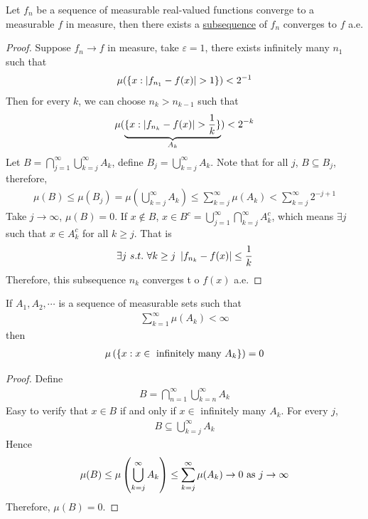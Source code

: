 \documentclass[11pt]{article}
\begin{document}
	\begin{proposition}
		Let $f_n$ be a sequence of measurable real-valued functions converge to a measurable $f$ in measure, then there exists a \ul{subsequence} of $f_n$ converges to $f$ a.e.
		\begin{proof}
			Suppose $f_n \to f$ in measure, take $\varepsilon = 1$, there exists infinitely many $n_1$ such that
			\begin{align}
				\mu(\{x : \left \vert {f_{n_1} - f(x)} \right \vert > 1 \}) < 2^{-1}
			\end{align}
			Then for every $k$, we can choose $n_k > n_{k-1}$ such that
			\begin{align}
				\mu(\underbrace{\{x : \left \vert {f_{n_k} - f(x)} \right \vert > \frac{1}{k} \}}_{A_k}) < 2^{-k}
			\end{align}
			Let $B = \bigcap_{j=1}^\infty \bigcup_{k=j}^\infty A_k$, define $B_j = \bigcup_{k=j}^\infty A_k$.
			Note that for all $j$, $B \subseteq B_j$, therefore,
			\begin{align}
				\mu(B) \leq \mu(B_j) = \mu(\bigcup_{k=j}^\infty A_k) \leq \sum_{k=j}^\infty \mu(A_k) < \sum_{k=j}^\infty 2^{-j+1}
			\end{align}
			Take $j \to \infty$, $\mu(B) = 0$. If $x \notin B$, $x \in B^c = \bigcup_{j=1}^\infty \bigcap_{k=j}^\infty A_k^c$, which means $\exists j$ such that $x \in A_k^c$ for all $k \geq j$. That is
			\begin{align}
				\exists j\ s.t.\ \forall k \geq j\ \left \vert {f_{n_k} - f(x)} \right \vert \leq \frac{1}{k}
			\end{align}
			Therefore, this subsequence $n_k$ converges t	o $f(x)$ a.e.
		\end{proof}
	\end{proposition}
	
	\begin{lemma}
		If $A_1, A_2, \cdots$ is a sequence of measurable sets such that
		\begin{align}
			\sum_{k=1}^\infty \mu(A_k) < \infty
		\end{align}
		then
		\begin{align}
			\mu\left(\left\{ x: x \in \text{{ infinitely many }} A_k \right\} \right) = 0
		\end{align}
		\begin{proof}
			Define
			\begin{align}
				B = \bigcap_{n=1}^\infty \bigcup_{k=n}^\infty A_k
			\end{align}
			Easy to verify that $x \in B$ if and only if $x \in $ infinitely many $A_k$. For every $j$,
			\begin{align}
				B \subseteq \bigcup_{k=j}^\infty A_k
			\end{align}
			Hence
			\begin{align}
				\mu(B) \leq \mu \left(\bigcup_{k=j}^\infty A_k\right) \leq \sum_{k=j}^\infty \mu(A_k) \to 0 \text{{ as }} j \to \infty
			\end{align}
			Therefore, $\mu(B) = 0$.
		\end{proof}
	\end{lemma}
	
\end{document}
